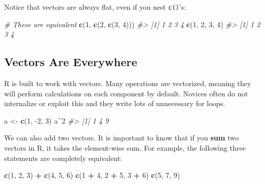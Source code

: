 \documentclass[
]{book}
\newenvironment{Shaded}{\begin{snugshade}}{\end{snugshade}}
\newcommand{\CommentTok}[1]{\textcolor[rgb]{0.56,0.35,0.01}{\textit{#1}}}
\newcommand{\DecValTok}[1]{\textcolor[rgb]{0.00,0.00,0.81}{#1}}
\newcommand{\KeywordTok}[1]{\textcolor[rgb]{0.13,0.29,0.53}{\textbf{#1}}}
\newcommand{\NormalTok}[1]{#1}
\newcommand{\OperatorTok}[1]{\textcolor[rgb]{0.81,0.36,0.00}{\textbf{#1}}}
\newcommand{\StringTok}[1]{\textcolor[rgb]{0.31,0.60,0.02}{#1}}
\begin{document}
Notice that vectors are always flat, even if you nest \texttt{c()}'s:

\begin{Shaded}
\begin{Highlighting}[]
\CommentTok{# These are equivalent}
\KeywordTok{c}\NormalTok{(}\DecValTok{1}\NormalTok{, }\KeywordTok{c}\NormalTok{(}\DecValTok{2}\NormalTok{, }\KeywordTok{c}\NormalTok{(}\DecValTok{3}\NormalTok{, }\DecValTok{4}\NormalTok{)))}
\CommentTok{#> [1] 1 2 3 4}
\KeywordTok{c}\NormalTok{(}\DecValTok{1}\NormalTok{, }\DecValTok{2}\NormalTok{, }\DecValTok{3}\NormalTok{, }\DecValTok{4}\NormalTok{)}
\CommentTok{#> [1] 1 2 3 4}
\end{Highlighting}
\end{Shaded}

\hypertarget{vectors-are-everywhere}{%
\subsection{Vectors Are Everywhere}\label{vectors-are-everywhere}}

R is built to work with vectors. Many operations are vectorized, meaning they will perform calculations on each component by default. Novices often do not internalize or exploit this and they write lots of unnecessary for loops.

\begin{Shaded}
\begin{Highlighting}[]
\NormalTok{a <-}\StringTok{ }\KeywordTok{c}\NormalTok{(}\DecValTok{1}\NormalTok{, }\DecValTok{-2}\NormalTok{, }\DecValTok{3}\NormalTok{)}
\NormalTok{a}\OperatorTok{^}\DecValTok{2}
\CommentTok{#> [1] 1 4 9}
\end{Highlighting}
\end{Shaded}

We can also add two vectors. It is important to know that if you \textbf{sum} two vectors in R, it takes the element-wise sum. For example, the following three statements are completely equivalent:

\begin{Shaded}
\begin{Highlighting}[]
\KeywordTok{c}\NormalTok{(}\DecValTok{1}\NormalTok{, }\DecValTok{2}\NormalTok{, }\DecValTok{3}\NormalTok{) }\OperatorTok{+}\StringTok{ }\KeywordTok{c}\NormalTok{(}\DecValTok{4}\NormalTok{, }\DecValTok{5}\NormalTok{, }\DecValTok{6}\NormalTok{)}
\KeywordTok{c}\NormalTok{(}\DecValTok{1} \OperatorTok{+}\StringTok{ }\DecValTok{4}\NormalTok{, }\DecValTok{2} \OperatorTok{+}\StringTok{ }\DecValTok{5}\NormalTok{, }\DecValTok{3} \OperatorTok{+}\StringTok{ }\DecValTok{6}\NormalTok{)}
\KeywordTok{c}\NormalTok{(}\DecValTok{5}\NormalTok{, }\DecValTok{7}\NormalTok{, }\DecValTok{9}\NormalTok{)}
\end{Highlighting}
\end{Shaded}
\end{document}
